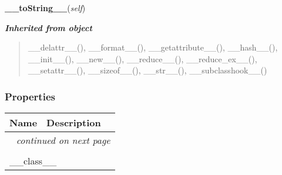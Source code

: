     \label{db_layer:Rule:__toString__}

    \vspace{0.5ex}

\hspace{.8\funcindent}\begin{boxedminipage}{\funcwidth}

    \raggedright \textbf{\_\_toString\_\_}(\textit{self})

\setlength{\parskip}{2ex}
\setlength{\parskip}{1ex}
    \end{boxedminipage}


\large{\textbf{\textit{Inherited from object}}}

\begin{quote}
\_\_delattr\_\_(), \_\_format\_\_(), \_\_getattribute\_\_(), \_\_hash\_\_(), \_\_init\_\_(), \_\_new\_\_(), \_\_reduce\_\_(), \_\_reduce\_ex\_\_(), \_\_setattr\_\_(), \_\_sizeof\_\_(), \_\_str\_\_(), \_\_subclasshook\_\_()
\end{quote}


  \subsubsection{Properties}

    \vspace{-1cm}
\hspace{\varindent}\begin{longtable}{|p{\varnamewidth}|p{\vardescrwidth}|l}
\cline{1-2}
\cline{1-2} \centering \textbf{Name} & \centering \textbf{Description}& \\
\cline{1-2}
\endhead\cline{1-2}\multicolumn{3}{r}{\small\textit{continued on next page}}\\\endfoot\cline{1-2}
\endlastfoot\multicolumn{2}{|l|}{\textit{Inherited from object}}\\
\multicolumn{2}{|p{\varwidth}|}{\raggedright \_\_class\_\_}\\
\cline{1-2}
\end{longtable}



